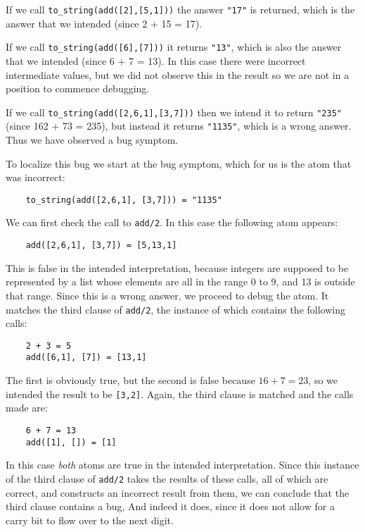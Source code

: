 If we call \texttt{to\_string(add([2],[5,1]))}
the answer \texttt{"17"} is returned,
which is the answer that we intended (since 2 + 15 = 17).

If we call \texttt{to\_string(add([6],[7]))}
it returns \texttt{"13"},
which is also the answer that we intended (since 6 + 7 = 13).
In this case there were incorrect intermediate values,
but we did not observe this in the result
so we are not in a position to commence debugging.

If we call \texttt{to\_string(add([2,6,1],[3,7]))}
then we intend it to return \texttt{"235"} (since 162 + 73 = 235),
but instead it returns \texttt{"1135"},
which is a wrong answer.
Thus we have observed a bug symptom.

To localize this bug we start at the bug symptom,
which for us is the atom that was incorrect:
\begin{verbatim}
    to_string(add([2,6,1], [3,7])) = "1135"
\end{verbatim}
We can first check the call to \texttt{add/2}.
In this case the following atom appears:
\begin{verbatim}
    add([2,6,1], [3,7]) = [5,13,1]
\end{verbatim}
This is false in the intended interpretation,
because integers are supposed to be represented
by a list whose elements are all in the range 0 to 9,
and 13 is outside that range.
Since this is a wrong answer, we proceed to debug the atom.
It matches the third clause of \texttt{add/2},
the instance of which contains the following calls:
\begin{verbatim}
    2 + 3 = 5
    add([6,1], [7]) = [13,1]
\end{verbatim}
The first is obviously true,
but the second is false because $16 + 7 = 23$,
so we intended the result to be \texttt{[3,2]}.
Again, the third clause is matched and the calls made are:
\begin{verbatim}
    6 + 7 = 13
    add([1], []) = [1]
\end{verbatim}
In this case \emph{both} atoms are true in the intended interpretation.
Since this instance of the third clause of \texttt{add/2}
takes the results of these calls, all of which are correct,
and constructs an incorrect result from them,
we can conclude that the third clause contains a bug,
And indeed it does,
since it does not allow for a carry bit
to flow over to the next digit.

